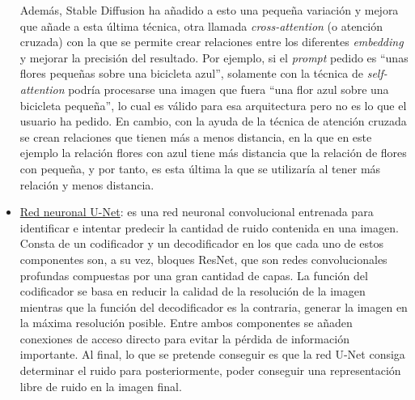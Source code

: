 \begin{itemize}
	Además, Stable Diffusion ha añadido a esto una pequeña variación y mejora que añade a esta última técnica, otra llamada \textit{cross-attention} (o atención cruzada) con la que se permite crear relaciones entre los diferentes \textit{embedding} y mejorar la precisión del resultado. Por ejemplo, si el \textit{prompt} pedido es “unas flores pequeñas sobre una bicicleta azul”, solamente con la técnica de \textit{self-attention} podría procesarse una imagen que fuera “una flor azul sobre una bicicleta pequeña”, lo cual es válido para esa arquitectura pero no es lo que el usuario ha pedido. En cambio, con la ayuda de la técnica de atención cruzada se crean relaciones que tienen más a menos distancia, en la que en este ejemplo la relación flores con azul tiene más distancia que la relación de flores con pequeña, y por tanto, es esta última la que se utilizaría al tener más relación y menos distancia.\\
	\item \underline{Red neuronal U-Net}: es una red neuronal convolucional entrenada para identificar e intentar predecir la cantidad de ruido contenida en una imagen. Consta de un codificador y un decodificador en los que cada uno de estos componentes son, a su vez, bloques ResNet, que son redes convolucionales profundas compuestas por una gran cantidad de capas. La función del codificador se basa en reducir la calidad de la resolución de la imagen mientras que  la función del decodificador es la contraria, generar la imagen en la máxima resolución posible. Entre ambos componentes se añaden conexiones de acceso directo para evitar la pérdida de información importante. Al final, lo que se pretende conseguir es que la red U-Net consiga determinar el ruido para posteriormente, poder conseguir una representación libre de ruido en la imagen final.\\
	

\end{itemize}
